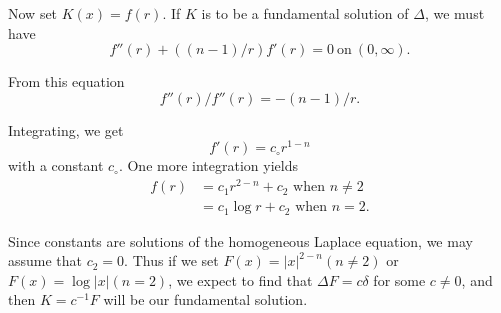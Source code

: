 Now set $K(x) = f(r)$. If $K$ is to be a fundamental solution of
 $\Delta$, we must have	
  $$
  f''(r) + ((n-1)/r) f'(r) =0 ~\text{on}~ (0, \infty).
  $$
 
 From this equation
 $$
 f''(r) /f'' (r) = - (n-1) /r. 
 $$
 
 Integrating, we get
 $$
 f'(r) = c_\circ r^{1-n}
 $$
with a constant $c_\circ$. One more integration yields
\begin{align*}
  f(r)& =c_1 r^{2-n} + c_2 \text{ when }n \neq 2\\
  &= c_1 \log r + c_2 \text{ when } n=2.
 \end{align*}\pageoriginale 

Since constants are solutions of the homogeneous Laplace equation, we
may assume that $ c_2=0$. Thus if we set $F(x) = | x|^{2-n} (n \neq
2)$ or $F(x) = \log |x| (n=2)$, we expect to find that $\Delta F = c
\delta $ for some $c \neq 0$, and then $K=c^{-1}F $ will be our
fundamental solution. 
 
